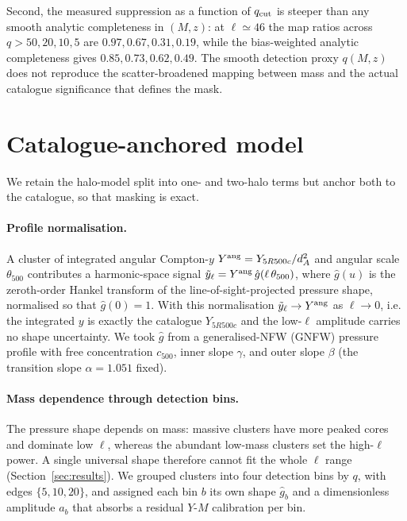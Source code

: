 \documentclass[twocolumn,10pt]{article}
\newcommand{\yang}{Y^{\rm ang}}
\newcommand{\thfive}{\theta_{500}}
\newcommand{\qcut}{q_{\rm cut}}
\newcommand{\ghat}{\hat{g}}
\begin{document}
Second, the measured suppression as a function of $\qcut$ is steeper than any
smooth analytic completeness in $(M,z)$: at $\ell\simeq46$ the map ratios across
$q>50,20,10,5$ are $0.97,0.67,0.31,0.19$, while the bias-weighted analytic
completeness gives $0.85,0.73,0.62,0.49$. The smooth detection proxy
$q(M,z)$ does not reproduce the scatter-broadened mapping between mass and the
actual catalogue significance that defines the mask.

\section{Catalogue-anchored model}
\label{sec:model}
We retain the halo-model split into one- and two-halo terms but anchor both to the
catalogue, so that masking is exact.

\paragraph{Profile normalisation.}
A cluster of integrated angular Compton-$y$
$\yang=Y_{5R500c}/d_A^2$ and angular scale $\thfive$ contributes a harmonic-space
signal $\tilde{y}_\ell=\yang\,\ghat(\ell\,\thfive)$, where $\ghat(u)$ is the
zeroth-order Hankel transform of the line-of-sight-projected pressure shape,
normalised so that $\ghat(0)=1$. With this normalisation $\tilde{y}_\ell\to\yang$
as $\ell\to0$, i.e. the integrated $y$ is exactly the catalogue $Y_{5R500c}$ and
the low-$\ell$ amplitude carries no shape uncertainty. We took $\ghat$ from a
generalised-NFW (GNFW) pressure profile \citep{Nagai2007,Arnaud2010} with free
concentration $c_{500}$, inner slope $\gamma$, and outer slope $\beta$ (the
transition slope $\alpha=1.051$ fixed).

\paragraph{Mass dependence through detection bins.}
The pressure shape depends on mass: massive clusters have more peaked cores and
dominate low $\ell$, whereas the abundant low-mass clusters set the high-$\ell$
power. A single universal shape therefore cannot fit the whole $\ell$ range
(Section~\ref{sec:results}). We grouped clusters into four detection bins by
$q$, with edges $\{5,10,20\}$, and assigned each bin $b$ its own shape
$\ghat_b$ and a dimensionless amplitude $a_b$ that absorbs a residual
$Y$-$M$ calibration per bin.
\end{document}
